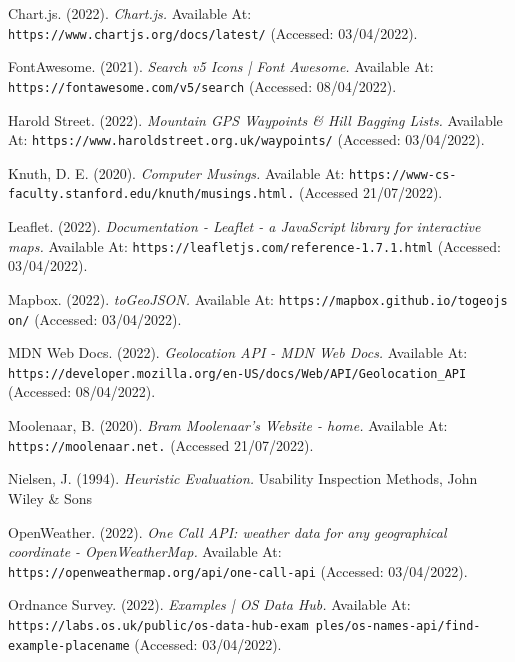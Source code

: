 \documentclass[11pt, english]{article}
\begin{document}
\newpage

	\renewcommand\refname{Bibliography}

	\fancyhead[L]{\leftmark}

	\begin{thebibliography}{9}

	\bibitem{}
		Chart.js. (2022).
		\textsl{Chart.js.}
		Available At:
		\texttt{https://www.chartjs.org/docs/latest/}
		(Accessed: 03/04/2022).

	\bibitem{}
		FontAwesome. (2021).
		\textsl{Search v5 Icons | Font Awesome.}
		Available At:
		\texttt{https://fontawesome.com/v5/search}
		(Accessed: 08/04/2022).

	\bibitem{}
		Harold Street. (2022).
		\textsl{Mountain GPS Waypoints \& Hill Bagging Lists.}
		Available At:
		\texttt{https://www.haroldstreet.org.uk/waypoints/}
		(Accessed: 03/04/2022).

	\bibitem{}
		Knuth, D. E. (2020).
		\textsl{Computer Musings.}
		Available At:
		\texttt{https://www-cs-faculty.stanford.edu/knuth/musings.html.}
		(Accessed 21/07/2022).

	\bibitem{}
		Leaflet. (2022).
		\textsl{Documentation - Leaflet - a JavaScript library for interactive maps.}
		Available At:
		\texttt{https://leafletjs.com/reference-1.7.1.html}
		(Accessed: 03/04/2022).

	\bibitem{}
		Mapbox. (2022).
		\textsl{toGeoJSON.}
		Available At:
		\texttt{https://mapbox.github.io/togeojs on/}
		(Accessed: 03/04/2022).

	\bibitem{}
		MDN Web Docs. (2022).
		\textsl{Geolocation API - MDN Web Docs.}
		Available At:
		\texttt{https://developer.mozilla.org/en-US/docs/Web/API/Geolocation\_API}
		(Accessed: 08/04/2022).

	\bibitem{}
		Moolenaar, B. (2020).
		\textsl{Bram Moolenaar's Website - home.}
		Available At:
		\texttt{https://moolenaar.net.}
		(Accessed 21/07/2022).

	\bibitem{}
		Nielsen, J. (1994).
		\textsl{Heuristic Evaluation.}
		Usability Inspection Methods, John Wiley \& Sons

	\bibitem{}
		OpenWeather. (2022).
		\textsl{One Call API: weather data for any geographical coordinate - OpenWeatherMap.}
		Available At:
		\texttt{https://openweathermap.org/api/one-call-api}
		(Accessed: 03/04/2022).

	\bibitem{}
		Ordnance Survey. (2022).
		\textsl{Examples | OS Data Hub.}
		Available At:
		\texttt{https://labs.os.uk/public/os-data-hub-exam ples/os-names-api/find-example-placename}
		(Accessed: 03/04/2022).


\end{thebibliography}
\end{document}
